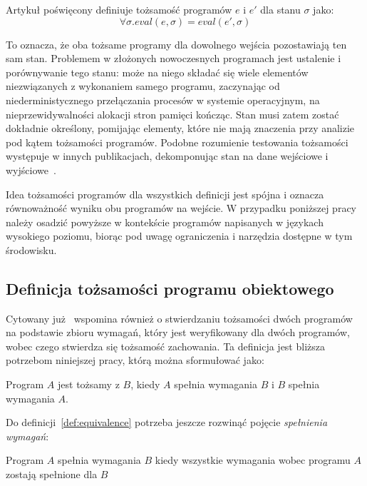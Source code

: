 Artykuł poświęcony \cite{plotkin1981structural} definiuje tożsamość programów \(e\) i \(e'\) dla stanu \(\sigma\) jako:
\begin{equation}
    \label{eq:equivalence}
    \forall\sigma.eval(e, \sigma) = eval(e', \sigma)
\end{equation}

To oznacza, że oba tożsame programy dla dowolnego wejścia pozostawiają ten sam stan.
Problemem w złożonych nowoczesnych programach jest ustalenie i porównywanie tego stanu:
może na niego składać się wiele elementów niezwiązanych z wykonaniem samego programu, zaczynając od niederministycznego
przełączania procesów w systemie operacyjnym, na nieprzewidywalności alokacji stron pamięci kończąc.
Stan musi zatem zostać dokładnie określony, pomijając elementy, które nie mają znaczenia przy analizie pod kątem
tożsamości programów.
Podobne rozumienie testowania tożsamości występuje w innych publikacjach, dekomponując stan na dane wejściowe i
wyjściowe~\cite{corbett2000bandera, tzevelekos2012program}.

Idea tożsamości programów dla wszystkich definicji jest spójna i oznacza równoważność wyniku obu programów na wejście.
W przypadku poniższej pracy należy osadzić powyższe w kontekście programów napisanych w językach wysokiego poziomu,
biorąc pod uwagę ograniczenia i narzędzia dostępne w tym środowisku.

\subsection{Definicja tożsamości programu obiektowego}
\label{subsec:equivalence_definition}

Cytowany już~\cite{tzevelekos2012program} wspomina również o stwierdzaniu tożsamości dwóch programów na podstawie
zbioru wymagań, który jest weryfikowany dla dwóch programów, wobec czego stwierdza się tożsamość zachowania.
Ta definicja jest bliższa potrzebom niniejszej pracy, którą można sformułować jako:

\begin{definition}
    \label{def:equivalence}
    Program \(A\) jest tożsamy z \(B\), kiedy \(A\) spełnia wymagania \(B\) i \(B\) spełnia wymagania \(A\).
\end{definition}

Do definicji~\ref{def:equivalence} potrzeba jeszcze rozwinąć pojęcie \textit{spełnienia wymagań}:

\begin{definition}
    \label{def:requirements}
    Program \(A\) spełnia wymagania \(B\) kiedy wszystkie wymagania wobec programu \(A\) zostają spełnione dla \(B\)
\end{definition}

